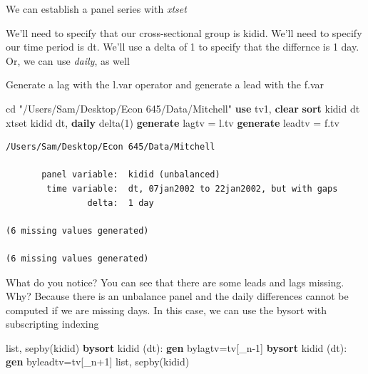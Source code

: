 \documentclass[
]{book}
\newenvironment{Shaded}{\begin{snugshade}}{\end{snugshade}}
\newcommand{\DataTypeTok}[1]{\textcolor[rgb]{0.13,0.29,0.53}{#1}}
\newcommand{\FunctionTok}[1]{\textcolor[rgb]{0.13,0.29,0.53}{\textbf{#1}}}
\newcommand{\KeywordTok}[1]{\textcolor[rgb]{0.13,0.29,0.53}{\textbf{#1}}}
\newcommand{\NormalTok}[1]{#1}
\newcommand{\OtherTok}[1]{\textcolor[rgb]{0.56,0.35,0.01}{#1}}
\newcommand{\StringTok}[1]{\textcolor[rgb]{0.31,0.60,0.02}{#1}}
\begin{document}
We can establish a panel series with \emph{xtset}

We'll need to specify that our cross-sectional group is kidid.
We'll need to specify our time period is dt.
We'll use a delta of 1 to specify that the differnce is 1 day.
Or, we can use \emph{daily}, as well

Generate a lag with the l.var operator and generate a lead with the f.var

\begin{Shaded}
\begin{Highlighting}[]
\NormalTok{cd }\StringTok{"/Users/Sam/Desktop/Econ 645/Data/Mitchell"}
\KeywordTok{use}\NormalTok{ tv1, }\KeywordTok{clear}
\KeywordTok{sort}\NormalTok{ kidid dt}
\NormalTok{xtset kidid dt, }\FunctionTok{daily}\NormalTok{ delta(1)}
\KeywordTok{generate}\NormalTok{ lagtv = }\OtherTok{l}\NormalTok{.tv}
\KeywordTok{generate}\NormalTok{ leadtv = f.tv}
\end{Highlighting}
\end{Shaded}

\begin{verbatim}
/Users/Sam/Desktop/Econ 645/Data/Mitchell

       panel variable:  kidid (unbalanced)
        time variable:  dt, 07jan2002 to 22jan2002, but with gaps
                delta:  1 day

(6 missing values generated)

(6 missing values generated)
\end{verbatim}

What do you notice? You can see that there are some leads and lags missing.
Why? Because there is an unbalance panel and the daily differences cannot be
computed if we are missing days. In this case, we can use the bysort with
subscripting indexing

\begin{Shaded}
\begin{Highlighting}[]
\OtherTok{list}\NormalTok{, sepby(kidid)}
\KeywordTok{bysort}\NormalTok{ kidid (dt): }\KeywordTok{gen}\NormalTok{ bylagtv=tv[}\DataTypeTok{\_n}\NormalTok{{-}1]}
\KeywordTok{bysort}\NormalTok{ kidid (dt): }\KeywordTok{gen}\NormalTok{ byleadtv=tv[}\DataTypeTok{\_n}\NormalTok{+1]}
\OtherTok{list}\NormalTok{, sepby(kidid)}
\end{Highlighting}
\end{Shaded}
\end{document}

